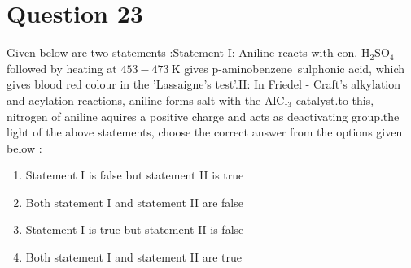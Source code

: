\documentclass{article}
\begin{document}
\section*{Question 23}
Given below are two statements :Statement I: Aniline reacts with con. \(\mathrm{H}_2 \mathrm{SO}_4\) followed by heating at \(453-473 \mathrm{~K}\) gives p-aminobenzene sulphonic acid, which gives blood red colour in the 'Lassaigne's test'.\newlineStatement II: In Friedel - Craft's alkylation and acylation reactions, aniline forms salt with the \(\mathrm{AlCl}_3\) catalyst.\newlineDue to this, nitrogen of aniline aquires a positive charge and acts as deactivating group.\newlineIn the light of the above statements, choose the correct answer from the options given below :
\begin{enumerate}[label=(\alph*)]
\item Statement I is false but statement II is true
\item Both statement I and statement II are false
\item Statement I is true but statement II is false
\item Both statement I and statement II are true
\end{enumerate}
\newpage
\end{document}
